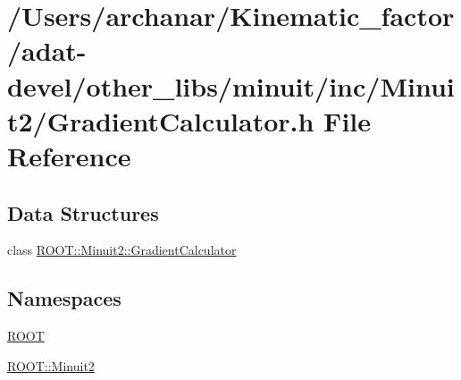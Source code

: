 \hypertarget{adat-devel_2other__libs_2minuit_2inc_2Minuit2_2GradientCalculator_8h}{}\section{/\+Users/archanar/\+Kinematic\+\_\+factor/adat-\/devel/other\+\_\+libs/minuit/inc/\+Minuit2/\+Gradient\+Calculator.h File Reference}
\label{adat-devel_2other__libs_2minuit_2inc_2Minuit2_2GradientCalculator_8h}
\subsection*{Data Structures}
\begin{DoxyCompactItemize}
\item 
class \mbox{\hyperlink{classROOT_1_1Minuit2_1_1GradientCalculator}{R\+O\+O\+T\+::\+Minuit2\+::\+Gradient\+Calculator}}
\end{DoxyCompactItemize}
\subsection*{Namespaces}
\begin{DoxyCompactItemize}
\item 
 \mbox{\hyperlink{namespaceROOT}{R\+O\+OT}}
\item 
 \mbox{\hyperlink{namespaceROOT_1_1Minuit2}{R\+O\+O\+T\+::\+Minuit2}}
\end{DoxyCompactItemize}
